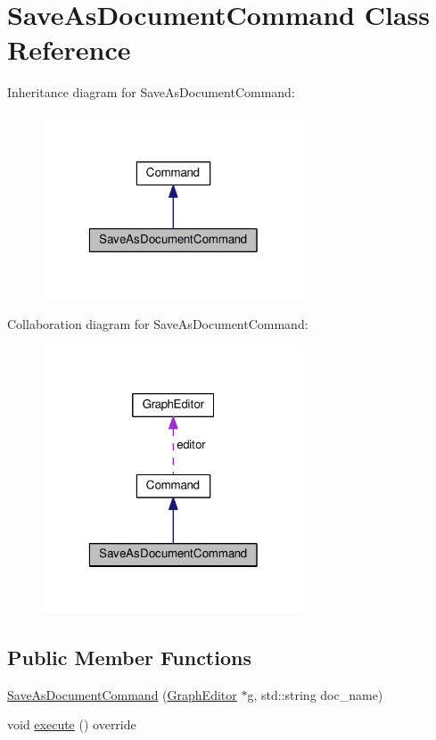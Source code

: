 \hypertarget{class_save_as_document_command}{\section{Save\-As\-Document\-Command Class Reference}
\label{class_save_as_document_command}
}


Inheritance diagram for Save\-As\-Document\-Command\-:
\nopagebreak
\begin{figure}[H]
\begin{center}
\leavevmode
\includegraphics[width=220pt]{class_save_as_document_command__inherit__graph}
\end{center}
\end{figure}


Collaboration diagram for Save\-As\-Document\-Command\-:
\nopagebreak
\begin{figure}[H]
\begin{center}
\leavevmode
\includegraphics[width=220pt]{class_save_as_document_command__coll__graph}
\end{center}
\end{figure}
\subsection*{Public Member Functions}
\begin{DoxyCompactItemize}
\item 
\hyperlink{class_save_as_document_command_af1ee9a34336f4831a1a72f1aabaebf13}{Save\-As\-Document\-Command} (\hyperlink{class_graph_editor}{Graph\-Editor} $\ast$g, std\-::string doc\-\_\-name)
\item 
void \hyperlink{class_save_as_document_command_a7e24e4880ba0d3545f3df16ef5116d40}{execute} () override
\end{DoxyCompactItemize}
